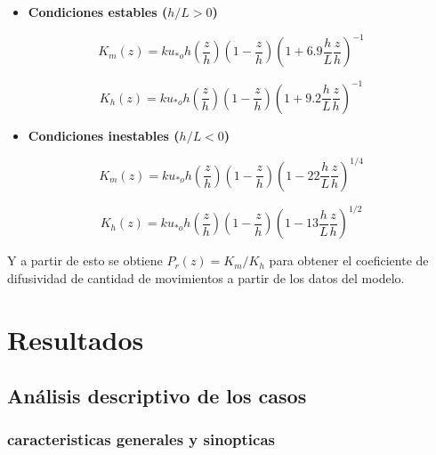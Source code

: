 \documentclass[12pt,spanish,oneside]{book}
\providecommand{\tightlist}{%
  \setlength{\itemsep}{0pt}\setlength{\parskip}{0pt}}
\begin{document}
\begin{itemize}
\tightlist
\item
  \textbf{Condiciones estables (\(h/L > 0\))}
\end{itemize}

\begin{equation} \label{k-1}
K_m(z) =  ku_{*o}h\left (\frac{z}{h} \right )\left(1-\frac{z}{h} \right)\left (1 + 6.9\frac{h}{L}\frac{z}{h} \right)^{-1}
\end{equation}

\begin{equation} \label{k-2}
K_h(z) =  ku_{*o}h\left (\frac{z}{h} \right )\left(1-\frac{z}{h} \right)\left (1 + 9.2\frac{h}{L}\frac{z}{h} \right)^{-1}
\end{equation}

\begin{itemize}
\tightlist
\item
  \textbf{Condiciones inestables (\(h/L < 0\))}
\end{itemize}

\begin{equation} \label{k-3}
K_m(z) =  ku_{*o}h\left (\frac{z}{h} \right )\left(1-\frac{z}{h} \right)\left (1 - 22\frac{h}{L}\frac{z}{h} \right)^{1/4}
\end{equation}

\begin{equation} \label{k-4}
K_h(z) =  ku_{*o}h\left (\frac{z}{h} \right )\left(1-\frac{z}{h} \right)\left (1 - 13\frac{h}{L}\frac{z}{h} \right)^{1/2}
\end{equation}

Y a partir de esto se obtiene \(P_r(z) = K_m/K_h\) para obtener el
coeficiente de difusividad de cantidad de movimientos a partir de los
datos del modelo.

\chapter{Resultados}\label{resultados}

\section{Análisis descriptivo de los
casos}\label{analisis-descriptivo-de-los-casos}

\subsection{caracteristicas generales y
sinopticas}\label{caracteristicas-generales-y-sinopticas}
\end{document}
